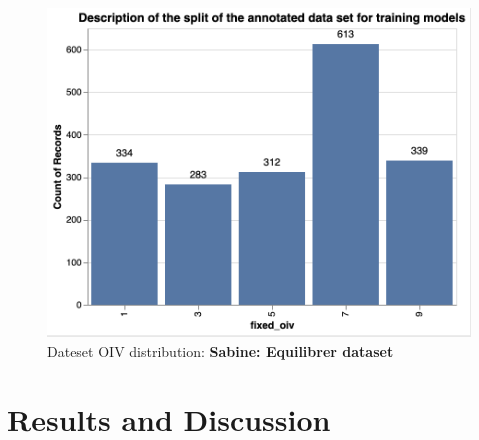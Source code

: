 \documentclass[english]{article}
\begin{document}
\begin{figure}[H]
    \begin{center}
        \includegraphics[width=0.7\linewidth]{2023_a_oiv_oiv_distribution}
        \caption{Dateset OIV distribution: \textbf{Sabine: Equilibrer dataset}}\label{fig:datadistribution}
    \end{center}
\end{figure}


\section{Results and Discussion}
\end{document}
